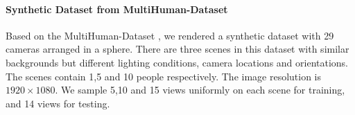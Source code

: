 \paragraph{Synthetic Dataset from MultiHuman-Dataset \cite{tao2021function4d,zheng2021deepmulticap}}
Based on the MultiHuman-Dataset \cite{tao2021function4d,zheng2021deepmulticap}, we rendered a synthetic dataset with 29 cameras arranged in a sphere. There are three scenes in this dataset with similar backgrounds but different lighting conditions, camera locations and orientations. The scenes contain 1,5 and 10 people respectively. The image resolution is $1920 \times 1080$. We sample 5,10 and 15 views uniformly on each scene for training, and 14 views for testing.